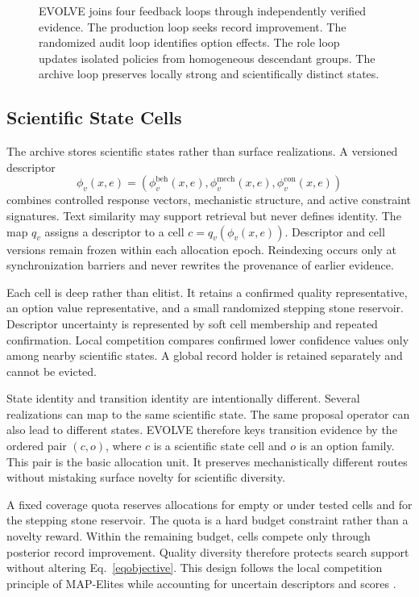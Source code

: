 \documentclass{article}
\begin{document}
\begin{figure}[t]
\centering
\resizebox{\linewidth}{!}{}
\caption{EVOLVE joins four feedback loops through independently verified evidence. The production loop seeks record improvement. The randomized audit loop identifies option effects. The role loop updates isolated policies from homogeneous descendant groups. The archive loop preserves locally strong and scientifically distinct states.}
\label{figframework}
\end{figure}

\subsection{Scientific State Cells}
\label{secstates}

The archive stores scientific states rather than surface realizations. A versioned descriptor
\begin{equation}
\phi_v(x,e)
=
\left(
\phi_v^{\mathrm{beh}}(x,e),
\phi_v^{\mathrm{mech}}(x,e),
\phi_v^{\mathrm{con}}(x,e)
\right)
\label{eqfingerprint}
\end{equation}
combines controlled response vectors, mechanistic structure, and active constraint signatures. Text similarity may support retrieval but never defines identity. The map $q_v$ assigns a descriptor to a cell $c=q_v(\phi_v(x,e))$. Descriptor and cell versions remain frozen within each allocation epoch. Reindexing occurs only at synchronization barriers and never rewrites the provenance of earlier evidence.

Each cell is deep rather than elitist. It retains a confirmed quality representative, an option value representative, and a small randomized stepping stone reservoir. Descriptor uncertainty is represented by soft cell membership and repeated confirmation. Local competition compares confirmed lower confidence values only among nearby scientific states. A global record holder is retained separately and cannot be evicted.

State identity and transition identity are intentionally different. Several realizations can map to the same scientific state. The same proposal operator can also lead to different states. EVOLVE therefore keys transition evidence by the ordered pair $(c,o)$, where $c$ is a scientific state cell and $o$ is an option family. This pair is the basic allocation unit. It preserves mechanistically different routes without mistaking surface novelty for scientific diversity.

A fixed coverage quota reserves allocations for empty or under tested cells and for the stepping stone reservoir. The quota is a hard budget constraint rather than a novelty reward. Within the remaining budget, cells compete only through posterior record improvement. Quality diversity therefore protects search support without altering Eq.~\eqref{eqobjective}. This design follows the local competition principle of MAP-Elites while accounting for uncertain descriptors and scores \citep{mouret2015,flageat2023}.
\end{document}
